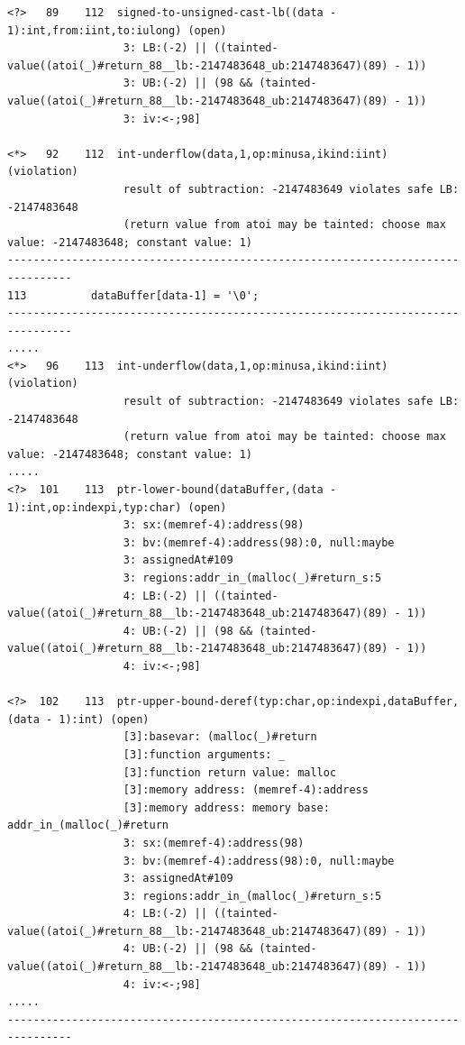 \documentclass[11pt]{article}
\begin{document}
\begin{tiny}
\begin{verbatim}
<?>   89    112  signed-to-unsigned-cast-lb((data - 1):int,from:iint,to:iulong) (open)
                  3: LB:(-2) || ((tainted-value((atoi(_)#return_88__lb:-2147483648_ub:2147483647)(89) - 1))
                  3: UB:(-2) || (98 && (tainted-value((atoi(_)#return_88__lb:-2147483648_ub:2147483647)(89) - 1))
                  3: iv:<-;98]
 
<*>   92    112  int-underflow(data,1,op:minusa,ikind:iint) (violation)
                  result of subtraction: -2147483649 violates safe LB: -2147483648 
                  (return value from atoi may be tainted: choose max value: -2147483648; constant value: 1)
--------------------------------------------------------------------------------
113          dataBuffer[data-1] = '\0';
--------------------------------------------------------------------------------
.....
<*>   96    113  int-underflow(data,1,op:minusa,ikind:iint) (violation)
                  result of subtraction: -2147483649 violates safe LB: -2147483648 
                  (return value from atoi may be tainted: choose max value: -2147483648; constant value: 1)
.....
<?>  101    113  ptr-lower-bound(dataBuffer,(data - 1):int,op:indexpi,typ:char) (open)
                  3: sx:(memref-4):address(98)
                  3: bv:(memref-4):address(98):0, null:maybe
                  3: assignedAt#109
                  3: regions:addr_in_(malloc(_)#return_s:5
                  4: LB:(-2) || ((tainted-value((atoi(_)#return_88__lb:-2147483648_ub:2147483647)(89) - 1))
                  4: UB:(-2) || (98 && (tainted-value((atoi(_)#return_88__lb:-2147483648_ub:2147483647)(89) - 1))
                  4: iv:<-;98]
 
<?>  102    113  ptr-upper-bound-deref(typ:char,op:indexpi,dataBuffer,(data - 1):int) (open)
                  [3]:basevar: (malloc(_)#return
                  [3]:function arguments: _
                  [3]:function return value: malloc
                  [3]:memory address: (memref-4):address
                  [3]:memory address: memory base: addr_in_(malloc(_)#return
                  3: sx:(memref-4):address(98)
                  3: bv:(memref-4):address(98):0, null:maybe
                  3: assignedAt#109
                  3: regions:addr_in_(malloc(_)#return_s:5
                  4: LB:(-2) || ((tainted-value((atoi(_)#return_88__lb:-2147483648_ub:2147483647)(89) - 1))
                  4: UB:(-2) || (98 && (tainted-value((atoi(_)#return_88__lb:-2147483648_ub:2147483647)(89) - 1))
                  4: iv:<-;98]
..... 
--------------------------------------------------------------------------------
\end{verbatim}
\end{tiny}
\end{document}
